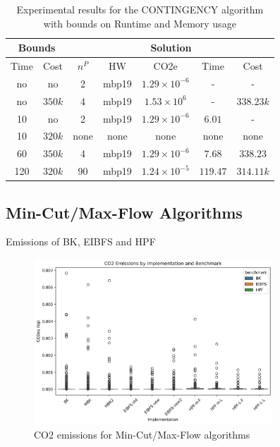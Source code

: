 \documentclass[a4paper,singleside,12pt]{report} %
\begin{document}
\begin{table}[h!]
    \centering
    \begin{tabular}{|cc|ccccc|}
        \hline
        \multicolumn{2}{|c|}{Bounds} & \multicolumn{5}{c|}{Solution} \\
        \hline
        Time & Cost & $n^P$ & HW & CO2e & Time & Cost \\
        \hline
        no & no & 2 & mbp19 & $1.29 \times 10^{-6}$ & - & - \\
        no & $350k$ & 4 & mbp19 & $1.53 \times 10^{6}$ & - & $338.23k$ \\
        10 & no & 2 & mbp19 & $1.29 \times 10^{-6}$ & $6.01$ & - \\
        10 & $320k$ & none & none & none & none & none \\
        60 & $350k$ & 4 & mbp19 & $1.29 \times 10^{-6}$ & $7.68$ & $338.23$ \\
        120 & $320k$ & 90 & mbp19 & $1.24 \times 10^{-5}$ & $119.47$ & $314.11k$ \\
        \hline
    \end{tabular}
    \caption{Experimental results for the CONTINGENCY algorithm with bounds on Runtime and Memory usage}
    \label{tab:contingency_results}
\end{table}

\subsection{Min-Cut/Max-Flow Algorithms}

Emissions of BK, EIBFS and HPF

\begin{figure}[h!]
    \centering
    \includegraphics[width=0.8\textwidth]{imgs/max_flow_emissions.png}
    \caption{CO2 emissions for Min-Cut/Max-Flow algorithms}
    \label{fig:max_flow_emissions}
\end{figure}
\end{document}
